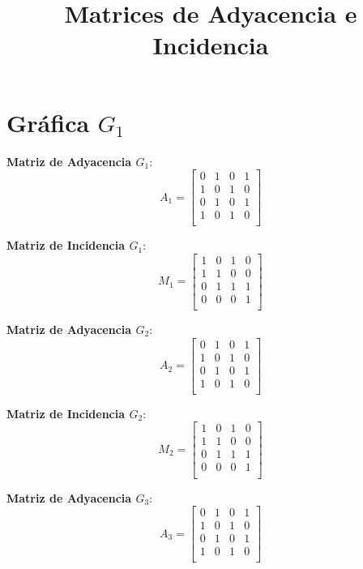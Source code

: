 \documentclass{article}
\begin{document}
\title{Matrices de Adyacencia e Incidencia}
\maketitle

\section*{Gráfica \( G_1 \)}

\textbf{Matriz de Adyacencia \( G_1 \)}:
\[
	A_1 =
	\begin{bmatrix}
		0 & 1 & 0 & 1 \\
		1 & 0 & 1 & 0 \\
		0 & 1 & 0 & 1 \\
		1 & 0 & 1 & 0 \\
	\end{bmatrix}
\]

\textbf{Matriz de Incidencia \( G_1 \)}:
\[
	M_1 =
	\begin{bmatrix}
		1 & 0 & 1 & 0 \\
		1 & 1 & 0 & 0 \\
		0 & 1 & 1 & 1 \\
		0 & 0 & 0 & 1 \\
	\end{bmatrix}
\]


\textbf{Matriz de Adyacencia \( G_2 \)}:
\[
	A_2 =
	\begin{bmatrix}
		0 & 1 & 0 & 1 \\
		1 & 0 & 1 & 0 \\
		0 & 1 & 0 & 1 \\
		1 & 0 & 1 & 0 \\
	\end{bmatrix}
\]

\textbf{Matriz de Incidencia \( G_2 \)}:
\[
	M_2 =
	\begin{bmatrix}
		1 & 0 & 1 & 0 \\
		1 & 1 & 0 & 0 \\
		0 & 1 & 1 & 1 \\
		0 & 0 & 0 & 1 \\
	\end{bmatrix}
\]

\textbf{Matriz de Adyacencia \( G_3 \)}:
\[
	A_3 =
	\begin{bmatrix}
		0 & 1 & 0 & 1 \\
		1 & 0 & 1 & 0 \\
		0 & 1 & 0 & 1 \\
		1 & 0 & 1 & 0 \\
	\end{bmatrix}
\]
\end{document}
